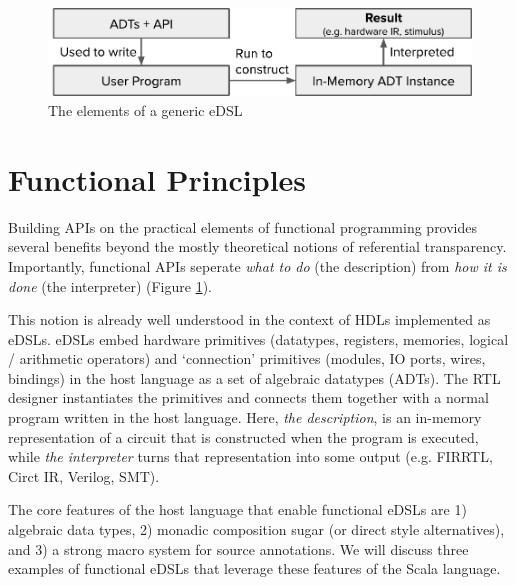 \documentclass[sigplan,review,nonacm,9pt]{acmart}
\begin{document}

\maketitle

\begin{figure}[h]
\includegraphics[width=\linewidth]{simcommand/functional_apis.pdf}
\caption{The elements of a generic eDSL}
\label{fig:functional_apis}
\end{figure}

\section{Functional Principles}

Building APIs on the practical elements of functional programming provides several benefits beyond the mostly theoretical notions of referential transparency\cite{fpinscala}.
Importantly, functional APIs seperate \textit{what to do} (the description) from \textit{how it is done} (the interpreter) (Figure \ref{fig:functional_apis}).

This notion is already well understood in the context of HDLs implemented as eDSLs.
eDSLs embed hardware primitives (datatypes, registers, memories, logical / arithmetic operators) and `connection' primitives (modules, IO ports, wires, bindings) in the host language as a set of algebraic datatypes (ADTs).
The RTL designer instantiates the primitives and connects them together with a normal program written in the host language.
Here, \textit{the description}, is an in-memory representation of a circuit that is constructed when the program is executed, while \textit{the interpreter} turns that representation into some output (e.g. FIRRTL, Circt IR, Verilog, SMT).

The core features of the host language that enable functional eDSLs are 1) algebraic data types, 2) monadic composition sugar (or direct style alternatives\cite{dotty_cps_async, koka}), and 3) a strong macro system for source annotations.
We will discuss three examples of functional eDSLs that leverage these features of the Scala language.
\end{document}
